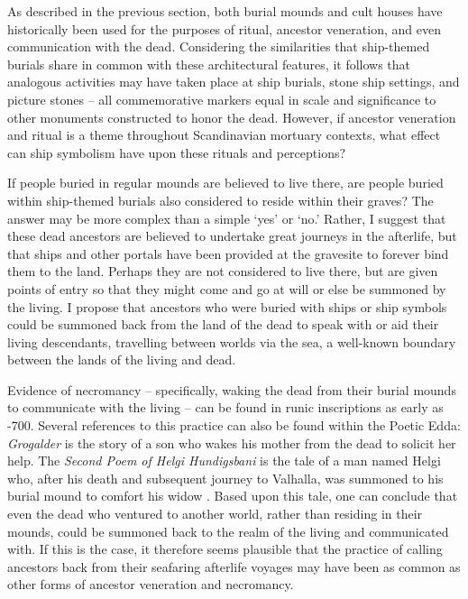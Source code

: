 
As described in the previous section, both burial mounds and cult houses have historically been used for the purposes of ritual, ancestor veneration, and even communication with the dead. Considering the similarities that ship-themed burials share in common with these architectural features, it follows that analogous activities may have taken place at ship burials, stone ship settings, and picture stones – all commemorative markers equal in scale and significance to other monuments constructed to honor the dead. However, if ancestor veneration and ritual is a theme throughout Scandinavian mortuary contexts, what effect can ship symbolism have upon these rituals and perceptions?

If people buried in regular mounds are believed to live there, are people buried within ship-themed burials also considered to reside within their graves? The answer may be more complex than a simple ‘yes’ or ‘no.’ Rather, I suggest that these dead ancestors are believed to undertake great journeys in the afterlife, but that ships and other portals have been provided at the gravesite to forever bind them to the land. Perhaps they are not considered to live there, but are given points of entry so that they might come and go at will or else be summoned by the living. I propose that ancestors who were buried with ships or ship symbols could be summoned back from the land of the dead to speak with or aid their living descendants, travelling between worlds via the sea, a well-known boundary between the lands of the living and dead.

Evidence of necromancy – specifically, waking the dead from their burial mounds to communicate with the living – can be found in runic inscriptions as early as -700. Several references to this practice can also be found within the Poetic Edda: \textit{Grogalder} is the story of a son who wakes his mother from the dead to solicit her help.
The \textit{Second Poem of Helgi Hundigsbani} is the tale of a man named Helgi who, after his death and subsequent journey to Valhalla, was summoned to his burial mound to comfort his widow \parencite[171]{Sanmark_2010}.  Based upon this tale, one can conclude that even the dead who ventured to another world, rather than residing in their mounds, could be summoned back to the realm of the living and communicated with. If this is the case, it therefore seems plausible that the practice of calling ancestors back from their seafaring afterlife voyages may have been as common as other forms of ancestor veneration and necromancy.

